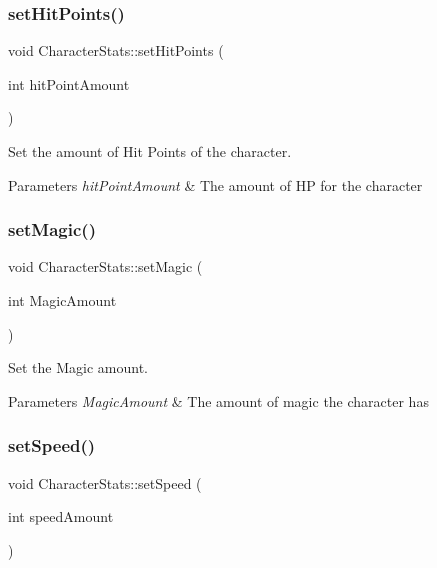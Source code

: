 \subsubsection{\texorpdfstring{setHitPoints()}{setHitPoints()}}
{\footnotesize\ttfamily void Character\+Stats\+::set\+Hit\+Points (\begin{DoxyParamCaption}\item[{int}]{hit\+Point\+Amount }\end{DoxyParamCaption})\hspace{0.3cm}{\ttfamily [inline]}}



Set the amount of Hit Points of the character. 


\begin{DoxyParams}{Parameters}
{\em hit\+Point\+Amount} & The amount of HP for the character \\
\hline
\end{DoxyParams}
\mbox{\label{classCharacterStats_a196481abbfd88753d5e6a55662ea086f}} 
\subsubsection{\texorpdfstring{setMagic()}{setMagic()}}
{\footnotesize\ttfamily void Character\+Stats\+::set\+Magic (\begin{DoxyParamCaption}\item[{int}]{Magic\+Amount }\end{DoxyParamCaption})\hspace{0.3cm}{\ttfamily [inline]}}



Set the Magic amount. 


\begin{DoxyParams}{Parameters}
{\em Magic\+Amount} & The amount of magic the character has \\
\hline
\end{DoxyParams}
\mbox{\label{classCharacterStats_a12f04dfcc06dae1bc1b0ae03babd28b6}} 
\subsubsection{\texorpdfstring{setSpeed()}{setSpeed()}}
{\footnotesize\ttfamily void Character\+Stats\+::set\+Speed (\begin{DoxyParamCaption}\item[{int}]{speed\+Amount }\end{DoxyParamCaption})\hspace{0.3cm}{\ttfamily [inline]}}



